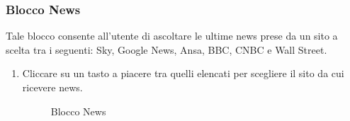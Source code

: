 \subsubsection{Blocco News}
Tale blocco consente all'utente di ascoltare le ultime news prese da un sito a scelta tra i seguenti: Sky, Google News, Ansa, BBC, CNBC e Wall Street.
\begin{enumerate}
	\item Cliccare su un tasto a piacere tra quelli elencati per scegliere il sito da cui ricevere news.
	\begin{figure}[!ht]
		\centering
		\caption{Blocco News}
	\end{figure}
\end{enumerate}
\newpage

